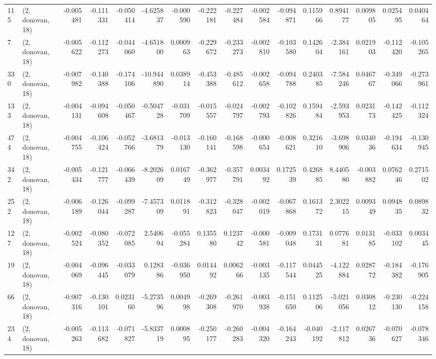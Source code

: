 \begin{tabular}{llrrrrrrrrrrrrrr}
115 &  (2, donovan, 18) &  -0.005481 & -0.111331 & -0.050414 &   -4.625837 & -0.000590 &  -0.222181 &  -0.227484 & -0.002584 & -0.094871 &  0.115966 &    0.894177 &  0.009805 &   0.025495 &   0.040464 \\
7   &  (2, donovan, 18) &  -0.005622 & -0.112273 & -0.044060 &   -4.651800 &  0.000963 &  -0.229672 &  -0.233273 & -0.002810 & -0.103580 &  0.142604 &   -2.384161 &  0.021903 &  -0.112420 &  -0.105265 \\
330 &  (2, donovan, 18) &  -0.007982 & -0.140388 & -0.174106 &  -10.944890 &  0.038914 &  -0.453388 &  -0.485612 & -0.002658 & -0.094788 &  0.240385 &   -7.584246 &  0.046767 &  -0.349066 &  -0.273961 \\
133 &  (2, donovan, 18) &  -0.004131 & -0.094608 & -0.050467 &   -0.504728 & -0.031709 &  -0.015557 &  -0.024797 & -0.002793 & -0.102826 &  0.159484 &   -2.593953 &  0.023173 &  -0.142425 &  -0.112324 \\
474 &  (2, donovan, 18) &  -0.004755 & -0.106424 & -0.052766 &   -3.681379 & -0.013130 &  -0.160141 &  -0.168598 & -0.000654 & -0.008621 &  0.321610 &   -3.698906 &  0.034036 &  -0.194634 &  -0.130945 \\
342 &  (2, donovan, 18) &  -0.005434 & -0.121777 & -0.066439 &   -8.202609 &  0.016749 &  -0.362977 &  -0.357791 &  0.003492 &  0.172539 &  0.426885 &    8.440580 & -0.003882 &   0.076246 &   0.271502 \\
252 &  (2, donovan, 18) &  -0.006189 & -0.126044 & -0.099287 &   -7.457309 &  0.011891 &  -0.312823 &  -0.328047 & -0.002019 & -0.067868 &  0.161372 &    2.302215 &  0.009349 &   0.094835 &   0.089832 \\
127 &  (2, donovan, 18) &  -0.002524 & -0.080352 & -0.072085 &    2.540694 & -0.055284 &   0.135580 &   0.123742 & -0.000581 & -0.009048 &  0.173131 &    0.077681 &  0.013185 &  -0.033102 &   0.003445 \\
19  &  (2, donovan, 18) &  -0.004069 & -0.096445 & -0.033079 &    0.128386 & -0.036950 &   0.014492 &   0.006266 & -0.003135 & -0.117544 &  0.044525 &   -4.122884 &  0.028772 &  -0.184382 &  -0.176905 \\
66  &  (2, donovan, 18) &  -0.007316 & -0.130101 &  0.023160 &   -5.273596 &  0.004998 &  -0.269308 &  -0.261970 & -0.003938 & -0.151650 &  0.112506 &   -5.021056 &  0.030812 &  -0.230130 &  -0.224158 \\
234 &  (2, donovan, 18) &  -0.005263 & -0.113682 & -0.071827 &   -5.833719 &  0.000895 &  -0.250177 &  -0.260283 & -0.004320 & -0.164243 & -0.040192 &   -2.117812 &  0.026736 &  -0.070627 &  -0.078346 \\

\end{tabular}
